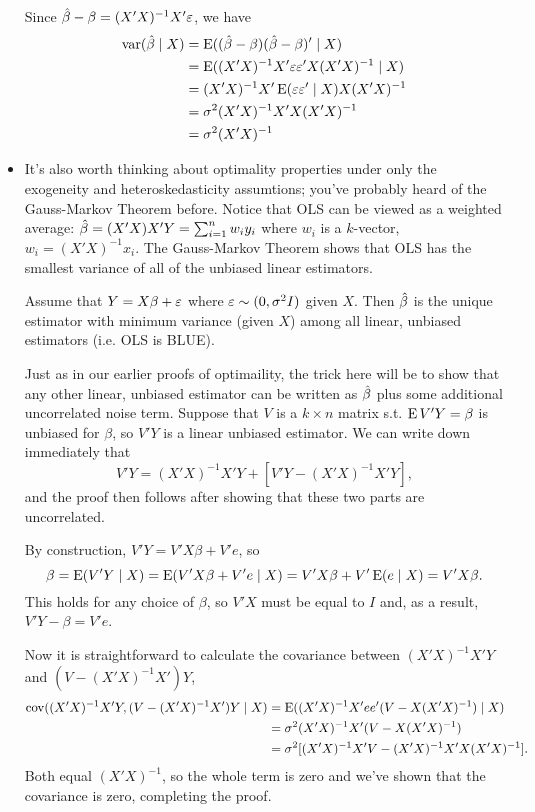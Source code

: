 \begin{itemize}[leftmargin=0pt]
  Since $\hat{\beta} - \beta = (X'X)^{-1}X'\varepsilon$, we have
  \begin{align*}
    \operatorname{var}(\hat{\beta} \mid X) &= \operatorname{E}((\hat{\beta} - \beta)(\hat{\beta}-\beta)' \mid X) \\
    &= \operatorname{E}((X'X)^{-1}X'\varepsilon\varepsilon'X(X'X)^{-1} \mid X) \\
    &= (X'X)^{-1} X' \operatorname{E}(\varepsilon\varepsilon' \mid X) X (X'X)^{-1} \\
    &= \sigma^2 (X'X)^{-1} X'X (X'X)^{-1} \\
    &= \sigma^2 (X'X)^{-1}
  \end{align*}

\item It's also worth thinking about optimality properties under only
  the exogeneity and heteroskedasticity assumtions; you've probably
  heard of the Gauss-Markov Theorem before.  Notice that OLS can be
  viewed as a weighted average: $\hat{\beta} = (X'X) X'Y = \sum_{i=1}^n w_i y_i$
  where $w_i$ is a $k$-vector, $w_i = (X'X)^{-1} x_i$.  The
  Gauss-Markov Theorem shows that OLS has the smallest variance of all
  of the unbiased linear estimators.
  \begin{thm}
    Assume that $Y = X\beta + \varepsilon$ where $\varepsilon \sim (0, \sigma^2 I)$ given $X$.
    Then $\hat{\beta}$ is the unique estimator with minimum variance (given
    $X$) among all linear, unbiased estimators (i.e. OLS is BLUE).
  \end{thm}

  Just as in our earlier proofs of optimaility, the trick here will be
  to show that any other linear, unbiased estimator can be written as
  $\hat{\beta}$ plus some additional uncorrelated noise term.  Suppose that
  $V$ is a $k \times n$ matrix s.t. $\operatorname{E} V'Y = \beta$ is unbiased for $\beta$, so
  $V'Y$ is a linear unbiased estimator.  We can write down immediately
  that
  \begin{equation*}
    V'Y = (X'X)^{-1}X'Y + [V'Y - (X'X)^{-1} X'Y],
  \end{equation*}
  and the proof then follows after showing that these two parts are
  uncorrelated.
  
  By construction, $V'Y = V'X\beta + V'e$, so
  \begin{equation*}
    \beta = \operatorname{E}(V'Y \mid X) = \operatorname{E}(V'X\beta + V'e \mid X) = V'X \beta + V'\operatorname{E}(e \mid X) = V'X\beta.
  \end{equation*}
  This holds for any choice of $\beta$, so $V'X$ must be equal to $I$ and,
  as a result, $V'Y - \beta = V'e$.

  Now it is straightforward to calculate the covariance between
  $(X'X)^{-1}X'Y$ and $(V - (X'X)^{-1}X')Y$,
  \begin{align*}
    \operatorname{cov}((X'X)^{-1}X'Y, (V - (X'X)^{-1}X')Y \mid X)
    &= \operatorname{E}((X'X)^{-1}X'e e'(V - X(X'X)^{-1}) \mid X) \\
    &= \sigma^2 (X'X)^{-1}X'(V - X(X'X)^{-1}) \\
    &= \sigma^2 [(X'X)^{-1}X'V - (X'X)^{-1} X'X (X'X)^{-1}].
  \end{align*}
  Both equal $(X'X)^{-1}$, so the whole term is zero and we've shown
  that the covariance is zero, completing the proof.


\end{itemize}
